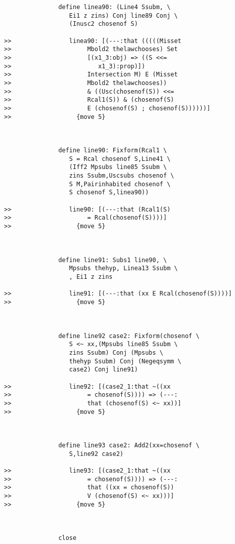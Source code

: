 \documentclass[12pt]{article}
\begin{document}
\begin{verbatim}
               define linea90: (Line4 Ssubm, \
                  Ei1 z zins) Conj line89 Conj \
                  (Inusc2 chosenof S)

>>                linea90: [(---:that (((((Misset
>>                     Mbold2 thelawchooses) Set
>>                     [(x1_3:obj) => ((S <<=
>>                        x1_3):prop)])
>>                     Intersection M) E (Misset
>>                     Mbold2 thelawchooses))
>>                     & ((Usc(chosenof(S)) <<=
>>                     Rcal1(S)) & (chosenof(S)
>>                     E (chosenof(S) ; chosenof(S))))))]
>>                  {move 5}



               define line90: Fixform(Rcal1 \
                  S = Rcal chosenof S,Line41 \
                  (Iff2 Mpsubs line85 Ssubm \
                  zins Ssubm,Uscsubs chosenof \
                  S M,Pairinhabited chosenof \
                  S chosenof S,linea90))

>>                line90: [(---:that (Rcal1(S)
>>                     = Rcal(chosenof(S))))]
>>                  {move 5}



               define line91: Subs1 line90, \
                  Mpsubs thehyp, Linea13 Ssubm \
                  , Ei1 z zins

>>                line91: [(---:that (xx E Rcal(chosenof(S))))]
>>                  {move 5}



               define line92 case2: Fixform(chosenof \
                  S <~ xx,(Mpsubs line85 Ssubm \
                  zins Ssubm) Conj (Mpsubs \
                  thehyp Ssubm) Conj (Negeqsymm \
                  case2) Conj line91)

>>                line92: [(case2_1:that ~((xx
>>                     = chosenof(S)))) => (---:
>>                     that (chosenof(S) <~ xx))]
>>                  {move 5}



               define line93 case2: Add2(xx=chosenof \
                  S,line92 case2)

>>                line93: [(case2_1:that ~((xx
>>                     = chosenof(S)))) => (---:
>>                     that ((xx = chosenof(S))
>>                     V (chosenof(S) <~ xx)))]
>>                  {move 5}



               close


\end{verbatim}
\end{document}
